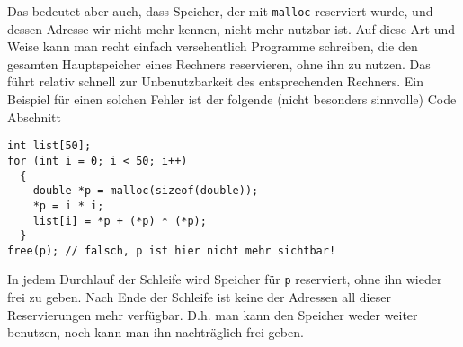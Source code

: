 Das bedeutet aber auch, dass Speicher, der mit \verb|malloc| reserviert wurde, und dessen Adresse wir nicht mehr kennen, nicht mehr nutzbar ist.
Auf diese Art und Weise kann man recht einfach versehentlich Programme schreiben, die den gesamten Hauptspeicher eines Rechners reservieren, ohne ihn zu nutzen.
Das führt relativ schnell zur Unbenutzbarkeit des entsprechenden Rechners.
Ein Beispiel für einen solchen Fehler ist der folgende (nicht besonders sinnvolle) Code Abschnitt
\begin{lstlisting}
int list[50];
for (int i = 0; i < 50; i++)
  {
    double *p = malloc(sizeof(double));
    *p = i * i;
    list[i] = *p + (*p) * (*p);
  }
free(p); // falsch, p ist hier nicht mehr sichtbar!
\end{lstlisting}
In jedem Durchlauf der Schleife wird Speicher für \verb|p| reserviert, ohne ihn wieder frei zu geben.
Nach Ende der Schleife ist keine der Adressen all dieser Reservierungen mehr verfügbar.
D.h. man kann den Speicher weder weiter benutzen, noch kann man ihn nachträglich frei geben.

\endinput
